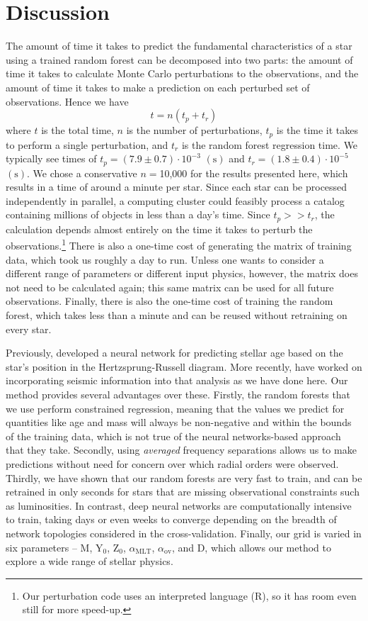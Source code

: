\documentclass[manuscript]{aastex}
\begin{document}
\section{Discussion}
The amount of time it takes to predict the fundamental characteristics of a star using a trained random forest can be decomposed into two parts: the amount of time it takes to calculate Monte Carlo perturbations to the observations, and the amount of time it takes to make a prediction on each perturbed set of observations. Hence we have
\begin{equation}
    t = n(t_p + t_r)
\end{equation}
where $t$ is the total time, $n$ is the number of perturbations, $t_p$ is the time it takes to perform a single perturbation, and $t_r$ is the random forest regression time. We typically see times of $t_p = (7.9 \pm 0.7) \cdot 10^{-3}$ $(\si{\s})$ and $t_r = (1.8 \pm 0.4) \cdot 10^{-5}$ $(\si{\s})$. We chose a conservative $n=$10,000 for the results presented here, which results in a time of around a minute per star. Since each star can be processed independently in parallel, a computing cluster could feasibly process a catalog containing millions of objects in less than a day's time. Since $t_p >> t_r$, the calculation depends almost entirely on the time it takes to perturb the observations.\footnote{Our perturbation code uses an interpreted language (R), so it has room even still for more speed-up.} There is also a one-time cost of generating the matrix of training data, which took us roughly a day to run. Unless one wants to consider a different range of parameters or different input physics, however, the matrix does not need to be calculated again; this same matrix can be used for all future observations. Finally, there is also the one-time cost of training the random forest, which takes less than a minute and can be reused without retraining on every star. 

Previously, \citet{pulone1997age} developed a neural network for predicting stellar age based on the star's position in the Hertzsprung-Russell diagram. More recently, \citet{2016arXiv160200902V} have worked on incorporating seismic information into that analysis as we have done here. Our method provides several advantages over these. Firstly, the random forests that we use perform constrained regression, meaning that the values we predict for quantities like age and mass will always be non-negative and within the bounds of the training data, which is not true of the neural networks-based approach that they take. Secondly, using \emph{averaged} frequency separations allows us to make predictions without need for concern over which radial orders were observed. Thirdly, we have shown that our random forests are very fast to train, and can be retrained in only seconds for stars that are missing observational constraints such as luminosities. In contrast, deep neural networks are computationally intensive to train, taking days or even weeks to converge depending on the breadth of network topologies considered in the cross-validation. Finally, our grid is varied in six parameters -- M, Y$_0$, Z$_0$, $\alpha_{\text{MLT}}$, $\alpha_{\text{ov}}$, and D, which allows our method to explore a wide range of stellar physics.
\end{document}
